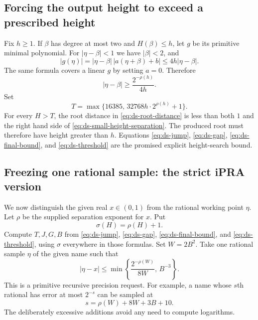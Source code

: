 \subsection{Forcing the output height to exceed a prescribed height}

Fix $h\geq1$.  If $\beta$ has degree at most two and $H(\beta)\leq h$,
let $g$ be its primitive minimal polynomial.  For
$|\eta-\beta|<1$ we have $|\beta|<2$, and
\[
 |g(\eta)|
 =|\eta-\beta|\,|a(\eta+\beta)+b|
 \leq4h|\eta-\beta|.
\]
The same formula covers a linear $g$ by setting $a=0$.  Therefore
\begin{equation}\label{eq:ds-small-height-separation}
 |\eta-\beta|\geq\frac{2^{-\rho(h)}}{4h}.
\end{equation}
Set
\begin{equation}\label{eq:ds-threshold}
 T=\max\{16385,\,32768h\cdot2^{\rho(h)}+1\}.
\end{equation}
For every $H>T$, the root distance in
\eqref{eq:ds-root-distance} is less than both $1$ and the right hand side
of \eqref{eq:ds-small-height-separation}.  The produced root must therefore
have height greater than $h$.  Equations
\eqref{eq:ds-jump}, \eqref{eq:ds-gap}, \eqref{eq:ds-final-bound}, and
\eqref{eq:ds-threshold} are the promised explicit height-search bound.

\subsection{Freezing one rational sample: the strict iPRA version}

We now distinguish the given real $x\in(0,1)$ from the rational working
point $\eta$.  Let $\rho$ be the supplied separation exponent for $x$.
Put
\[
 \sigma(H)=\rho(H)+1.
\]
Compute $T,J,G,B$ from
\eqref{eq:ds-jump}, \eqref{eq:ds-gap}, \eqref{eq:ds-final-bound}, and
\eqref{eq:ds-threshold}, using $\sigma$ everywhere in those formulas.
Set $W=2B^2$.  Take one rational sample $\eta$ of the given name such that
\begin{equation}\label{eq:ds-freeze}
 |\eta-x|\leq
 \min\left\{\frac{2^{-\rho(W)}}{8W},\,B^{-3}\right\}.
\end{equation}
This is a primitive recursive precision request.  For example, a name
whose $s$th rational has error at most $2^{-s}$ can be sampled at
\[
 s=\rho(W)+8W+3B+10.
\]
The deliberately excessive additions avoid any need to compute logarithms.

